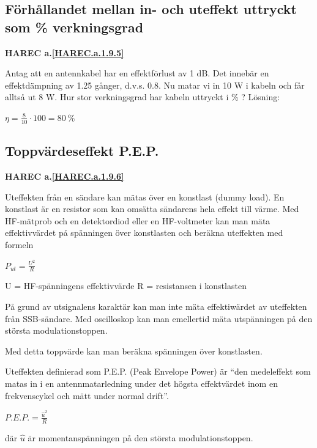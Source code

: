 \subsection{Förhållandet mellan in- och uteffekt uttryckt som \% verkningsgrad}
\textbf{HAREC a.\ref{HAREC.a.1.9.5}\label{myHAREC.a.1.9.5}}

Antag att en antennkabel har en effektförlust av 1 dB. Det innebär en
effektdämpning av 1.25 gånger, d.v.s. 0.8. Nu matar vi in 10 W i kabeln och får
alltså ut 8 W. Hur stor verkningsgrad har kabeln uttryckt i \% ?
Lösning:

\(\eta = \frac{8}{10} \cdot 100 = 80\ \%\)

\subsection{Toppvärdeseffekt P.E.P.}
\textbf{HAREC a.\ref{HAREC.a.1.9.6}\label{myHAREC.a.1.9.6}}

Uteffekten från en sändare kan mätas över en konstlast (dummy load). En
konstlast är en resistor som kan omsätta sändarens hela effekt till värme. Med
HF-mätprob och en detektordiod eller en HF-voltmeter kan man mäta
effektivvärdet på spänningen över konstlasten och beräkna uteffekten med
formeln

\(P_{ut} = \frac{U^2}{R}\)

U = HF-spänningens effektivvärde
R = resistansen i konstlasten

På grund av utsignalens karaktär kan man inte mäta effektiwärdet av uteffekten
från SSB-sändare. Med oscilloskop kan man emellertid mäta utspänningen på den
största modulationstoppen.

Med detta toppvärde kan man beräkna spänningen över konstlasten.

Uteffekten definierad som P.E.P. (Peak Envelope Power) är ``den medeleffekt som
matas in i en antennmatarledning under det högsta effektvärdet inom en
frekvenscykel och mätt under normal drift''.

\(P.E.P. = \frac{\hat{u}^2}{R}\)

där \(\hat{u}\) är momentanspänningen på den största modulationstoppen.

